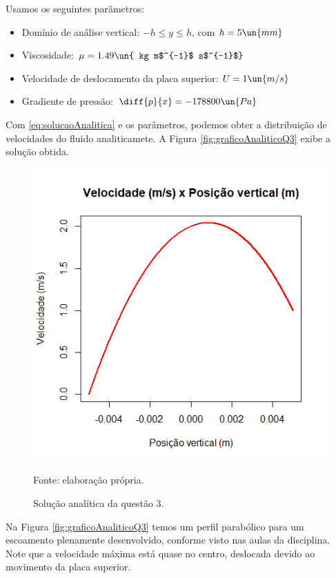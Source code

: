 Usamos os seguintes parâmetros:

\begin{itemize}
    \item Domínio de análise vertical: $-h \leq y \leq h$, com $h = 5 \un{mm}$
    \item Viscosidade: $\mu=1.49 \un{ kg m$^{-1}$ s$^{-1}$}$
    \item Velocidade de deslocamento da placa superior: $U=1 \un{m/s}$
    \item Gradiente de pressão: $\diff{p}{x} = -178800 \un{Pa}$
\end{itemize}

Com \eqref{eq:solucaoAnalitica} e os parâmetros, podemos obter a distribuição de velocidades
do fluido analiticamete. A Figura \eqref{fig:graficoAnaliticoQ3} exibe a solução obtida.

\begin{figure}[h!]
    \caption{Solução analítica da questão 3.}
    \label{fig:graficoAnaliticoQ3}
    \centering
    \centerline{\includegraphics[scale=0.7]{graficoAnaliticoQ3.png}}
    \par{Fonte: elaboração própria.}
\end{figure}

Na Figura \eqref{fig:graficoAnaliticoQ3} temos um perfil parabólico para um escoamento plenamente
desenvolvido, conforme visto nas aulas da disciplina. Note que a velocidade máxima está quase no centro,
deslocada devido ao movimento da placa superior.

